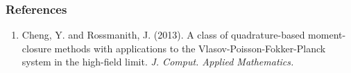 \documentclass[11pt]{beamer}
\begin{document}






\begin{frame}[allowframebreaks]
        \frametitle{References}
       \begin{enumerate}
\item Cheng, Y. and Rossmanith, J. (2013). A class of quadrature-based moment-closure methods with applications to the Vlasov-Poisson-Fokker-Planck system in the high-field limit. \it{J. Comput. Applied Mathematics}.


\end{enumerate}
\end{frame}


\end{document}
